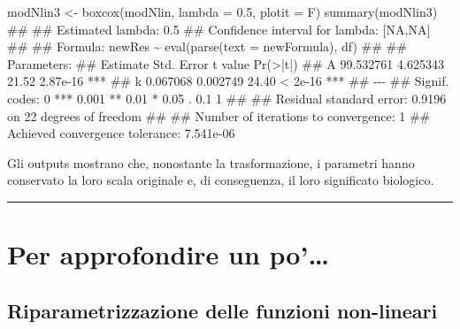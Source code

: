 \documentclass[a4paper,12pt,oneside]{book}
\newenvironment{Shaded}{\begin{snugshade}}{\end{snugshade}}
\newcommand{\FloatTok}[1]{#1}
\newcommand{\DocumentationTok}[1]{#1}
\newcommand{\OtherTok}[1]{#1}
\newcommand{\FunctionTok}[1]{#1}
\newcommand{\AttributeTok}[1]{#1}
\newcommand{\NormalTok}[1]{#1}
\begin{document}
\begin{Shaded}
\begin{Highlighting}[]
\NormalTok{modNlin3 }\OtherTok{\textless{}{-}} \FunctionTok{boxcox}\NormalTok{(modNlin, }\AttributeTok{lambda =} \FloatTok{0.5}\NormalTok{, }\AttributeTok{plotit =}\NormalTok{ F)}
\FunctionTok{summary}\NormalTok{(modNlin3)}
\DocumentationTok{\#\# }
\DocumentationTok{\#\# Estimated lambda: 0.5 }
\DocumentationTok{\#\# Confidence interval for lambda: [NA,NA]}
\DocumentationTok{\#\# }
\DocumentationTok{\#\# Formula: newRes \textasciitilde{} eval(parse(text = newFormula), df)}
\DocumentationTok{\#\# }
\DocumentationTok{\#\# Parameters:}
\DocumentationTok{\#\#    Estimate Std. Error t value Pr(\textgreater{}|t|)    }
\DocumentationTok{\#\# A 99.532761   4.625343   21.52 2.87e{-}16 ***}
\DocumentationTok{\#\# k  0.067068   0.002749   24.40  \textless{} 2e{-}16 ***}
\DocumentationTok{\#\# {-}{-}{-}}
\DocumentationTok{\#\# Signif. codes:  0 \textquotesingle{}***\textquotesingle{} 0.001 \textquotesingle{}**\textquotesingle{} 0.01 \textquotesingle{}*\textquotesingle{} 0.05 \textquotesingle{}.\textquotesingle{} 0.1 \textquotesingle{} \textquotesingle{} 1}
\DocumentationTok{\#\# }
\DocumentationTok{\#\# Residual standard error: 0.9196 on 22 degrees of freedom}
\DocumentationTok{\#\# }
\DocumentationTok{\#\# Number of iterations to convergence: 1 }
\DocumentationTok{\#\# Achieved convergence tolerance: 7.541e{-}06}
\end{Highlighting}
\end{Shaded}

Gli outputs mostrano che, nonostante la trasformazione, i parametri hanno conservato la loro scala originale e, di conseguenza, il loro significato biologico.

\begin{center}\rule{0.5\linewidth}{0.5pt}\end{center}

\hypertarget{per-approfondire-un-po-1}{%
\section{Per approfondire un po'\ldots{}}\label{per-approfondire-un-po-1}}

\hypertarget{riparametrizzazione-delle-funzioni-non-lineari}{%
\subsection{Riparametrizzazione delle funzioni non-lineari}\label{riparametrizzazione-delle-funzioni-non-lineari}}
\end{document}
